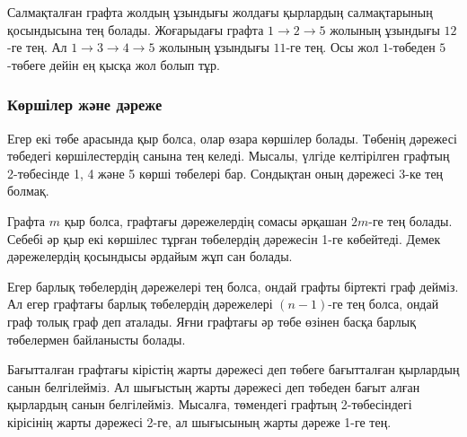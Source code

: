 Салмақталған графта жолдың ұзындығы жолдағы қырлардың салмақтарының қосындысына тең болады.
Жоғарыдағы графта $1 \rightarrow 2 \rightarrow 5$ жолының ұзындығы $12$-ге тең. 
Ал $1 \rightarrow 3 \rightarrow 4 \rightarrow 5$ жолының ұзындығы $11$-ге тең.
Осы жол $1$-төбеден $5$-төбеге дейін ең қысқа жол болып тұр.

\subsubsection{Көршілер және дәреже}


Егер екі төбе арасында қыр болса, олар өзара көршілер болады.
Төбенің дәрежесі төбедегі көршілестердің санына тең келеді.
Мысалы, үлгіде келтірілген графтың 2-төбесінде 1, 4 және 5 
көрші төбелері бар. Сондықтан оның дәрежесі 3-ке тең болмақ.

\begin{center}
\end{center}

Графта $m$ қыр болса, графтағы дәрежелердің сомасы әрқашан $2m$-ге тең болады. 
Себебі әр қыр екі көршілес тұрған
төбелердің дәрежесін 1-ге көбейтеді. 
Демек дәрежелердің қосындысы әрдайым жұп сан болады.


Егер барлық төбелердің дәрежелері тең болса, ондай графты біртекті граф дейміз.
Ал егер графтағы барлық төбелердің дәрежелері $(n-1)$-ге тең болса, ондай граф толық граф деп аталады. 
Яғни графтағы әр төбе өзінен басқа барлық төбелермен байланысты болады.


Бағытталған графтағы кірістің жарты дәрежесі деп төбеге бағытталған қырлардың санын белгілейміз.
Ал шығыстың жарты дәрежесі деп төбеден бағыт алған қырлардың санын белгілейміз.
Мысалға, төмендегі графтың 2-төбесіндегі кірісінің жарты дәрежесі 2-ге, ал шығысының жарты дәреже 1-ге тең.


